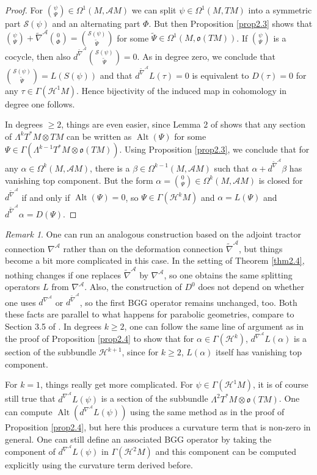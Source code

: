 \documentclass[12pt,a4paper]{amsart}
\def\frak{\mathfrak}
\def\Cal{\mathcal}
\newcommand{\al}{\alpha}
\newcommand{\be}{\beta}
\newcommand{\Ga}{\Gamma}
\newcommand{\La}{\Lambda}
\newcommand{\Om}{\Omega}
\newcommand{\Alt}{\operatorname{Alt}}
\newcommand{\tn}{\widetilde{\nabla}}
\newcounter{theorem}
\numberwithin{theorem}{section}
\numberwithin{equation}{section}
\theoremstyle{definition}
\theoremstyle{remark}
\newtheorem{remark}[theorem]{Remark}
\begin{document}
\begin{proof}
For $\binom{\psi}{\Psi}\in\Om^1(M,\Cal AM)$ we can split $\psi\in\Om^1(M,TM)$ into a
symmetric part $\Cal S(\psi)$ and an alternating part $\Phi$. But then Proposition
\ref{prop2.3} shows that $\binom{\psi}{\Psi}+\tn^{\Cal A}\binom{0}{\Phi}=\binom{\Cal
  S(\psi)}{\tilde\Psi}$ for some $\tilde\Psi\in\Om^1(M,\frak o(TM))$. If
$\binom{\psi}{\Psi}$ is a cocycle, then also $d^{\tn^{\Cal A}}\binom{\Cal
  S(\psi)}{\tilde\Psi}=0$. As in degree zero, we conclude that $\binom{\Cal
  S(\psi)}{\tilde\Psi}=L(S(\psi))$ and that $d^{\tn^{\Cal A}}L(\tau)=0$ is equivalent
to $D(\tau)=0$ for any $\tau\in\Ga(\Cal H^1M)$. Hence bijectivity of the induced map
in cohomology in degree one follows. 

In degrees $\geq 2$, things are even easier, since Lemma 2 of \cite{Arnold-Hu} shows
that any section of $\La^kT^*M\otimes TM$ can be written as $\Alt(\Psi)$ for some
$\Psi\in\Ga(\La^{k-1}T^*M\otimes\frak o(TM))$. Using Proposition \ref{prop2.3}, we
conclude that for any $\al\in\Om^k(M,\Cal AM)$, there is a $\be\in\Om^{k-1}(M,\Cal
AM)$ such that $\al+d^{\tn^{\Cal A}}\be$ has vanishing top component. But the
form $\al=\binom{0}{\Psi}\in\Om^k(M,\Cal AM)$ is closed for $d^{\tn^{\Cal A}}$ if and
only if $\Alt(\Psi)=0$, so $\Psi\in\Ga(\Cal H^kM)$ and $\al=L(\Psi)$ and
$d^{\tn^{\Cal A}}\al=D(\Psi)$.
 \end{proof}

 \begin{remark}\label{rem2.4}
   One can run an analogous construction based on the adjoint tractor connection
   $\nabla^{\Cal A}$ rather than on the deformation connection $\tn^{\Cal A}$, but
   things become a bit more complicated in this case. In the setting of Theorem
   \ref{thm2.4}, nothing changes if one replaces $\tn^{\Cal A}$ by $\nabla^{\Cal A}$,
   so one obtains the same splitting operators $L$ from $\nabla^{\Cal A}$. Also, the
   construction of $D^0$ does not depend on whether one uses $d^{\nabla^{\Cal A}}$ or
   $d^{\tn^{\Cal A}}$, so the first BGG operator remains unchanged, too. Both these
   facts are parallel to what happens for parabolic geometries, compare to Section
   3.5 of \cite{deformations}. In degrees $k\geq 2$, one can follow the same line of
   argument as in the proof of Proposition \ref{prop2.4} to show that for
   $\al\in\Ga(\Cal H^k)$, $d^{\nabla^{\Cal A}}L(\al)$ is a section of the subbundle
   $\Cal H^{k+1}$, since for $k\geq 2$, $L(\al)$ itself has vanishing top component.

   For $k=1$, things really get more complicated. For $\psi\in\Ga(\Cal H^1M)$, it is
   of course still true that $d^{\nabla^{\Cal A}}L(\psi)$ is a section of the
   subbundle $\La^2T^*M\otimes\frak o(TM)$. One can compute $\Alt(d^{\nabla^{\Cal
       A}}L(\psi))$ using the same method as in the proof of Proposition
   \ref{prop2.4}, but here this produces a curvature term that is non-zero in
   general. One can still define an associated BGG operator by taking the component
   of $d^{\nabla^{\Cal A}}L(\psi)$ in $\Ga(\Cal H^2M)$ and this component can be
   computed explicitly using the curvature term derived before.
 \end{remark}
\end{document}
